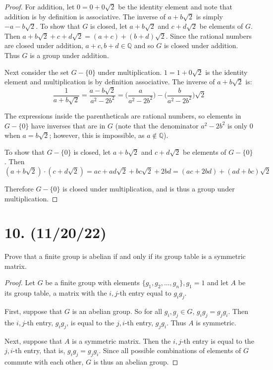\documentclass{article}
\begin{document}
\begin{proof}
      For addition, let $0 = 0 + 0\sqrt{2}$ be the identity element and note that addition is by definition is associative. The inverse of $a + b\sqrt{2}$ is simply $-a - b\sqrt{2}$. To show that $G$ is closed, let $a + b\sqrt{2}$ and $c + d\sqrt{2}$ be elements of $G$. Then $a + b\sqrt{2} + c + d\sqrt{2} = (a + c) + (b + d)\sqrt{2}.$ Since the rational numbers are closed under addition, $a + c, b + d \in \mathbb{Q}$ and so $G$ is closed under addition. Thus $G$ is a group under addition.

      Next consider the set $G - \{0\}$ under multiplication. $1 = 1 + 0\sqrt{2}$ is the identity element and multiplication is by definition associative. The inverse of $a + b\sqrt{2}$ is: 
      \begin{equation*}
            \frac{1}{a + b\sqrt{2}} = \frac{a - b\sqrt{2}}{a^2 - 2b^2} = \bigl(\frac{a}{a^2 - 2b^2}\bigr) - \bigl(\frac{b}{a^2 - 2b^2}\bigr)\sqrt{2}
      \end{equation*}

      The expressions inside the parentheticals are rational numbers, so elements in $G - \{0\}$ have inverses that are in $G$ (note that the denominator $a^2 - 2b^2$ is only $0$ when $a = b\sqrt{2}$; however, this is impossible, as $a \notin \mathbb{Q}$).
      
      To show that $G - \{0\}$ is closed, let $a + b\sqrt{2}$ and $c + d\sqrt{2}$ be elements of $G - \{0\}$. Then 
      \begin{equation*}
            (a + b\sqrt{2}) \cdot (c + d\sqrt{2}) = ac + ad\sqrt{2} + bc\sqrt{2} + 2bd = (ac + 2bd) + (ad + bc)\sqrt{2}
      \end{equation*}

      Therefore $G - \{0\}$ is closed under multiplication, and is thus a group under multiplication.

\end{proof}

\section*{10. (11/20/22)}

Prove that a finite group is abelian if and only if its group table is a symmetric matrix.

\begin{proof}
      Let $G$ be a finite group with elements $\{g_1, g_2, ... , g_n\}, g_1 = 1$ and let $A$ be its group table, a matrix with the $i,j$-th entry equal to $g_i g_j$.

      First, suppose that $G$ is an abelian group. So for all $g_i, g_j \in G$, $g_i g_j = g_j g_i$. Then the $i,j$-th entry, $g_i g_j$, is equal to the $j,i$-th entry, $g_j g_i$. Thus $A$ is symmetric.

      Next, suppose that $A$ is a symmetric matrix. Then the $i,j$-th entry is equal to the $j,i$-th entry, that is, $g_i g_j = g_j g_i$. Since all possible combinations of elements of $G$ commute with each other, $G$ is thus an abelian group.
\end{proof}
\end{document}
